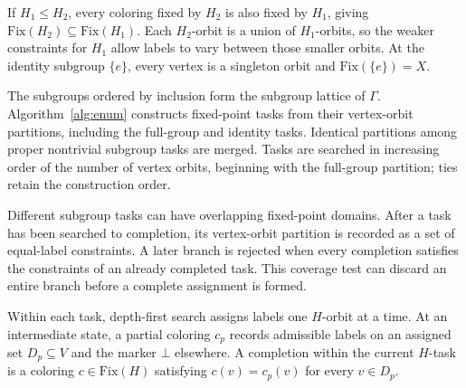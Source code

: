 \documentclass[a5paper, 10pt]{article}
\begin{document}
If $H_1\leq H_2$, every coloring fixed by $H_2$ is also fixed by $H_1$, giving $\mathrm{Fix}(H_2)\subseteq\mathrm{Fix}(H_1)$. Each $H_2$-orbit is a union of $H_1$-orbits, so the weaker constraints for $H_1$ allow labels to vary between those smaller orbits. At the identity subgroup $\{e\}$, every vertex is a singleton orbit and $\mathrm{Fix}(\{e\})=X$.

The subgroups ordered by inclusion form the subgroup lattice of $\Gamma$. Algorithm~\ref{alg:enum} constructs fixed-point tasks from their vertex-orbit partitions, including the full-group and identity tasks. Identical partitions among proper nontrivial subgroup tasks are merged. Tasks are searched in increasing order of the number of vertex orbits, beginning with the full-group partition; ties retain the construction order.

Different subgroup tasks can have overlapping fixed-point domains. After a task has been searched to completion, its vertex-orbit partition is recorded as a set of equal-label constraints. A later branch is rejected when every completion satisfies the constraints of an already completed task. This coverage test can discard an entire branch before a complete assignment is formed.

Within each task, depth-first search assigns labels one $H$-orbit at a time. At an intermediate state, a partial coloring $c_p$ records admissible labels on an assigned set $D_p\subseteq V$ and the marker $\bot$ elsewhere. A completion within the current $H$-task is a coloring $c\in\mathrm{Fix}(H)$ satisfying $c(v)=c_p(v)$ for every $v\in D_p$.
\end{document}
